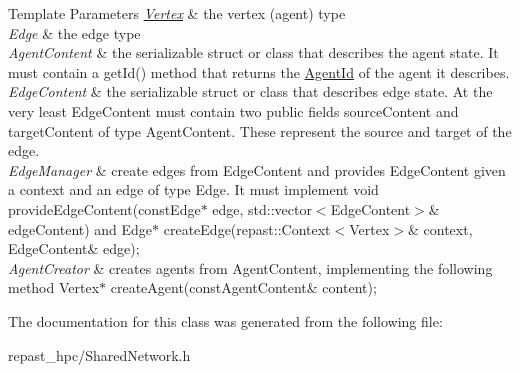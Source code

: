\begin{DoxyTemplParams}{Template Parameters}
{\em \hyperlink{classrepast_1_1_vertex}{Vertex}} & the vertex (agent) type \\
\hline
{\em Edge} & the edge type \\
\hline
{\em Agent\-Content} & the serializable struct or class that describes the agent state. It must contain a get\-Id() method that returns the \hyperlink{classrepast_1_1_agent_id}{Agent\-Id} of the agent it describes. \\
\hline
{\em Edge\-Content} & the serializable struct or class that describes edge state. At the very least Edge\-Content must contain two public fields source\-Content and target\-Content of type Agent\-Content. These represent the source and target of the edge. \\
\hline
{\em Edge\-Manager} & create edges from Edge\-Content and provides Edge\-Content given a context and an edge of type Edge. It must implement void provide\-Edge\-Content(const\-Edge$\ast$ edge, std\-::vector$<$\-Edge\-Content$>$\& edge\-Content) and Edge$\ast$ create\-Edge(repast\-::\-Context$<$\-Vertex$>$\& context, Edge\-Content\& edge); \\
\hline
{\em Agent\-Creator} & creates agents from Agent\-Content, implementing the following method Vertex$\ast$ create\-Agent(const\-Agent\-Content\& content); \\
\hline
\end{DoxyTemplParams}


The documentation for this class was generated from the following file\-:\begin{DoxyCompactItemize}
\item 
repast\-\_\-hpc/Shared\-Network.\-h\end{DoxyCompactItemize}

